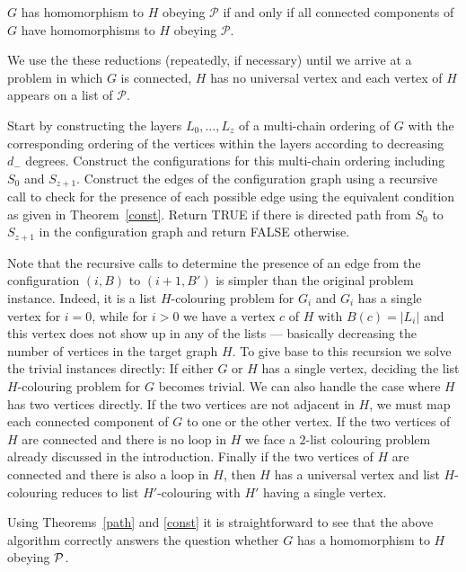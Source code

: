 \documentclass[12pt]{llncs}
\begin{document}
$G$ has homomorphism to $H$ obeying $\mathcal P$ if and only if all connected
components of $G$ have homomorphisms to $H$ obeying $\mathcal P$.

We use the these reductions (repeatedly, if necessary) until we arrive at a
problem in which $G$ is connected, $H$ has no universal
vertex and each vertex of $H$ appears on a list of $\mathcal P$.

Start by constructing the layers $L_0,\ldots,L_z$ of a multi-chain ordering of
$G$ with the corresponding ordering of the vertices within the layers
according to decreasing $d_-$ degrees. Construct the
configurations for this multi-chain ordering including $S_0$ and $S_{z+1}$.
Construct the edges of the configuration graph using a recursive
  call to check for the presence of each possible edge using the equivalent
  condition as given in Theorem~\ref{const}.
Return TRUE if there is directed path from $S_0$ to
  $S_{z+1}$ in the configuration graph and
  return FALSE otherwise.

Note that the recursive calls to determine the presence of an edge
from the configuration $(i,B)$ to $(i+1,B')$ is simpler than the original
problem instance. Indeed, it is a list $H$-colouring problem for $G_i$ and
$G_i$ has a single vertex for $i=0$, while for $i>0$ we have a vertex $c$ of
$H$ with $B(c)=|L_i|$ and this vertex does not show up in any of the lists ---
basically decreasing the number of vertices in the target graph $H$. To give
base to this recursion we solve the trivial instances directly:
If either $G$ or $H$ has a single vertex, deciding the list $H$-colouring
problem for $G$ becomes trivial. We can also handle the case where $H$ has
two vertices directly. If the two vertices are not adjacent in $H$, we must
map each connected component of $G$ to one or the other vertex. If the two
vertices of $H$ are connected and there is no loop in $H$ we face a $2$-list
colouring problem already discussed in the introduction. Finally if the two
vertices of $H$ are connected and there is also a loop in $H$, then $H$ has a
universal vertex and list $H$-colouring reduces to list $H'$-colouring with
$H'$ having a single vertex.

Using Theorems~\ref{path} and \ref{const} it is
straightforward to see that the above algorithm correctly answers the
question whether $G$ has a homomorphism to $H$ obeying $\cal P$.
\end{document}
